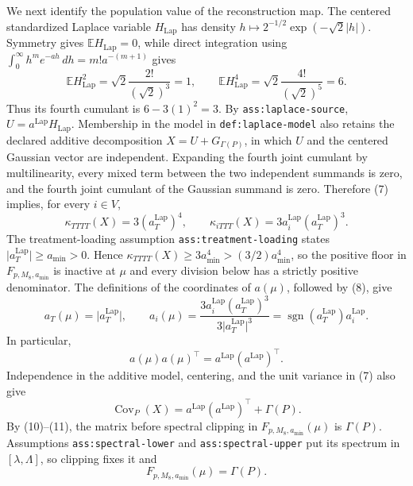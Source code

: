 We next identify the population value of the reconstruction map.  The
centered standardized Laplace variable \(H_{\mathrm{Lap}}\) has density
\(h\mapsto 2^{-1/2}\exp(-\sqrt2\lvert h\rvert)\).  Symmetry gives
\(\mathbb EH_{\mathrm{Lap}}=0\), while direct integration using
\(\int_0^\infty h^m e^{-ah}\,dh=m!a^{-(m+1)}\) gives
\[
 \mathbb EH_{\mathrm{Lap}}^2
 =\sqrt2\frac{2!}{(\sqrt2)^3}=1,
 \qquad
 \mathbb EH_{\mathrm{Lap}}^4
 =\sqrt2\frac{4!}{(\sqrt2)^5}=6.                       \tag{7}
\]
Thus its fourth cumulant is \(6-3(1)^2=3\).
By \texttt{ass:laplace-source},
\(U=a^{\mathrm{Lap}}H_{\mathrm{Lap}}\).  Membership in the model in
\texttt{def:laplace-model} also retains the declared additive decomposition
\(X=U+G_{\Gamma(P)}\), in which \(U\) and the centered Gaussian vector are
independent.  Expanding the fourth joint cumulant by multilinearity, every
mixed term between the two independent summands is zero, and the fourth
joint cumulant of the Gaussian summand is zero.  Therefore (7) implies, for
every \(i\in V\),
\[
 \kappa_{TTTT}(X)=3(a_T^{\mathrm{Lap}})^4,
 \qquad
 \kappa_{iTTT}(X)=3a_i^{\mathrm{Lap}}(a_T^{\mathrm{Lap}})^3. \tag{8}
\]
The treatment-loading assumption \texttt{ass:treatment-loading} states
\(\lvert a_T^{\mathrm{Lap}}\rvert\geq a_{\min}>0\).  Hence
\(\kappa_{TTTT}(X)\geq3a_{\min}^4>(3/2)a_{\min}^4\), so the positive
floor in \(F_{p,M_8,a_{\min}}\) is inactive at \(\mu\) and every division
below has a strictly positive denominator.  The definitions of the
coordinates of \(a(\mu)\), followed by (8), give
\[
 a_T(\mu)=\lvert a_T^{\mathrm{Lap}}\rvert,
 \qquad
 a_i(\mu)
 =\frac{3a_i^{\mathrm{Lap}}(a_T^{\mathrm{Lap}})^3}
 {3\lvert a_T^{\mathrm{Lap}}\rvert^3}
 =\operatorname{sgn}(a_T^{\mathrm{Lap}})a_i^{\mathrm{Lap}}. \tag{9}
\]
In particular,
\[
 a(\mu)a(\mu)^\top
 =a^{\mathrm{Lap}}(a^{\mathrm{Lap}})^\top.              \tag{10}
\]
Independence in the additive model, centering, and the unit variance in (7)
also give
\[
 \operatorname{Cov}_P(X)
 =a^{\mathrm{Lap}}(a^{\mathrm{Lap}})^\top+\Gamma(P).    \tag{11}
\]
By (10)--(11), the matrix before spectral clipping in
\(F_{p,M_8,a_{\min}}(\mu)\) is \(\Gamma(P)\).  Assumptions
\texttt{ass:spectral-lower} and \texttt{ass:spectral-upper} put its spectrum
in \([\lambda,\Lambda]\), so clipping fixes it and
\[
 F_{p,M_8,a_{\min}}(\mu)=\Gamma(P).                     \tag{12}
\]

